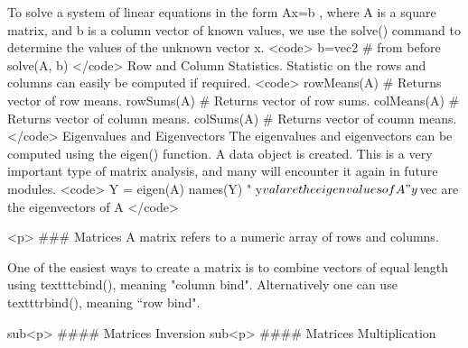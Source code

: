 To solve a system of linear equations in the form Ax=b , where A is a square matrix, and b is a column vector of known values, we use the solve() command to determine the values of the unknown vector x.
<code>
b=vec2  # from before
solve(A, b)
</code>
Row and Column Statistics.
Statistic on the rows and columns can easily be computed if required.
<code>
rowMeans(A)  # Returns vector of row means.
rowSums(A)  # Returns vector of row sums.
colMeans(A)  # Returns vector of column means.
colSums(A)  # Returns vector of coumn means.
</code>
Eigenvalues and Eigenvectors
The eigenvalues and eigenvectors can be computed using the eigen() function.  A data object is created.
This is a very important type of matrix analysis, and many will encounter it again in future modules.
<code>
Y = eigen(A)
names(Y)
"	y$val are the eigenvalues of A
"	y$vec are the eigenvectors of A
</code>


<p>
### {Matrices}
A matrix refers to a numeric array of rows and columns.

One of the easiest ways to create a matrix is to combine vectors of equal
length using texttt{cbind()}, meaning "column bind". Alternatively one can use  texttt{rbind()}, meaning ``row bind".


sub<p>
#### {Matrices Inversion}
sub<p>
#### {Matrices Multiplication}

